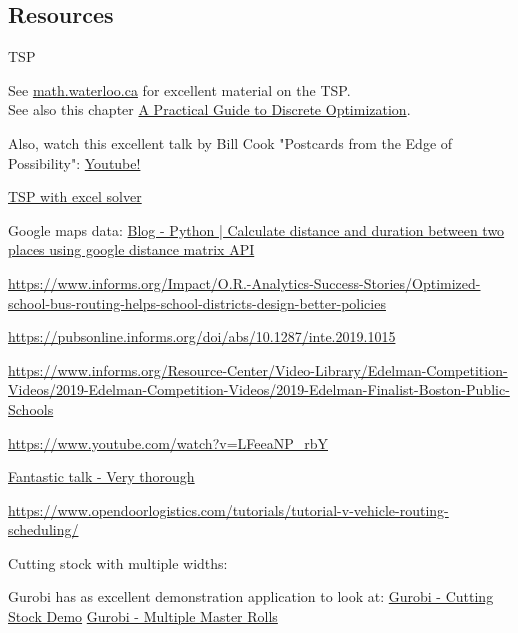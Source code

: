 \subsection{Resources}
TSP
\begin{resource}
See \href{http://www.math.uwaterloo.ca/tsp/index.html}{math.waterloo.ca} for excellent material on the TSP.\\
See also this chapter \href{https://www.math.uwaterloo.ca/~bico/papers/comp_chapter1.pdf}{A Practical Guide to Discrete
Optimization}.

Also, watch this excellent talk by Bill Cook "Postcards from the Edge of Possibility":
\href{https://m.youtube.com/watch?v=5VjphFYQKj8}{Youtube!}

\href{https://www.youtube.com/watch?v=UQYJvSjXE6I}{TSP with excel solver}

Google maps data:
\href{https://www.geeksforgeeks.org/python-calculate-distance-duration-two-places-using-google-distance-matrix-api/}{Blog - Python | Calculate distance and duration between two places using google distance matrix API}
\end{resource}
\begin{resource}
\url{https://www.informs.org/Impact/O.R.-Analytics-Success-Stories/Optimized-school-bus-routing-helps-school-districts-design-better-policies}

\url{https://pubsonline.informs.org/doi/abs/10.1287/inte.2019.1015}

\url{https://www.informs.org/Resource-Center/Video-Library/Edelman-Competition-Videos/2019-Edelman-Competition-Videos/2019-Edelman-Finalist-Boston-Public-Schools}


\url{https://www.youtube.com/watch?v=LFeeaNP_rbY}

\href{https://www.youtube.com/watch?v=BZA_UaX8rs8&t=23s&ab_channel=MERSCognitiveRobotics}{Fantastic talk - Very thorough}

\url{https://www.opendoorlogistics.com/tutorials/tutorial-v-vehicle-routing-scheduling/}
\end{resource}

\begin{resource}
Cutting stock with multiple widths:

Gurobi has as excellent demonstration application to look at:
\href{https://demos.gurobi.com/cutstock/}{Gurobi - Cutting Stock Demo}
\href{https://www.gurobi.com/cutting-stock-problem-with-multiple-master-rolls/}{Gurobi - Multiple Master Rolls}
\end{resource}
